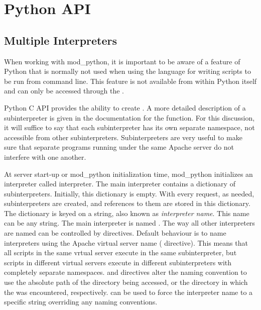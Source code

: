 \chapter{Python API\label{pythonapi}}

\section{Multiple Interpreters\label{pyapi-interps}}
      
When working with mod_python, it is important to be aware of a feature
of Python that is normally not used when using the language for
writing scripts to be run from command line. This feature is not
available from within Python itself and can only be accessed through
the .

Python C API provides the ability to create . A
more detailed description of a subinterpreter is given in the
documentation for the
function. For this discussion, it will suffice to say that each
subinterpreter has its own separate namespace, not accessible from
other subinterpreters. Subinterpreters are very useful to make sure
that separate programs running under the same Apache server do not
interfere with one another.

At server start-up or mod_python initialization time, mod_python
initializes an interpreter called  interpreter.  The main
interpreter contains a dictionary of subinterpreters. Initially, this
dictionary is empty. With every request, as needed, subinterpreters
are created, and references to them are stored in this dictionary. The
dictionary is keyed on a string, also known as \emph{interpreter
name}. This name can be any string.  The main interpreter is named
.  The way all other interpreters are named can
be controlled by  directives. Default behaviour is
to name interpreters using the Apache virtual server name
( directive). This means that all scripts in the same
vrtual server execute in the same subinterpreter, but scripts in
different virtual servers execute in different subinterpreters with
completely separate namespaces.
 and
directives alter the naming convention to use the absolute path of the
directory being accessed, or the directory in which the
 was encountered, respectively.
 can be used to
force the interpreter name to a specific string overriding any naming
conventions.

